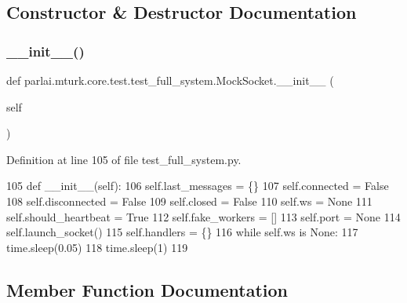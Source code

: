 \subsection{Constructor \& Destructor Documentation}
\mbox{\label{classparlai_1_1mturk_1_1core_1_1test_1_1test__full__system_1_1MockSocket_a2f3062cf26828b0b213e4ddaf0ebbde5}} 
\subsubsection{\texorpdfstring{\+\_\+\+\_\+init\+\_\+\+\_\+()}{\_\_init\_\_()}}
{\footnotesize\ttfamily def parlai.\+mturk.\+core.\+test.\+test\+\_\+full\+\_\+system.\+Mock\+Socket.\+\_\+\+\_\+init\+\_\+\+\_\+ (\begin{DoxyParamCaption}\item[{}]{self }\end{DoxyParamCaption})}



Definition at line 105 of file test\+\_\+full\+\_\+system.\+py.


\begin{DoxyCode}
105     \textcolor{keyword}{def }\_\_init\_\_(self):
106         self.last\_messages = \{\}
107         self.connected = \textcolor{keyword}{False}
108         self.disconnected = \textcolor{keyword}{False}
109         self.closed = \textcolor{keyword}{False}
110         self.ws = \textcolor{keywordtype}{None}
111         self.should\_heartbeat = \textcolor{keyword}{True}
112         self.fake\_workers = []
113         self.port = \textcolor{keywordtype}{None}
114         self.launch\_socket()
115         self.handlers = \{\}
116         \textcolor{keywordflow}{while} self.ws \textcolor{keywordflow}{is} \textcolor{keywordtype}{None}:
117             time.sleep(0.05)
118         time.sleep(1)
119 
\end{DoxyCode}


\subsection{Member Function Documentation}
\mbox{\label{classparlai_1_1mturk_1_1core_1_1test_1_1test__full__system_1_1MockSocket_ad8f95da992b7df7b8c823bd98d014491}} 
